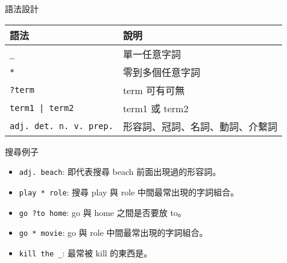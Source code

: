 \documentclass[12pt,c]{beamer}
\begin{document}
\begin{frame}[plain,shrink=5]{語法設計}
  \begin{tabu}{X[1.2]X[2]}
    \hline
    \rowfont{\bf} 語法 & 說明  \\
    \hline 
    \lstinline/_/ & 單一任意字詞 \\
    \lstinline/*/ & 零到多個任意字詞  \\
    \lstinline/?term/ & term 可有可無 \\
    \lstinline!term1 | term2! & term1 或 term2 \\
    \lstinline/adj. det. n. v. prep./ & 形容詞、冠詞、名詞、動詞、介繫詞 \\
    \hline
  \end{tabu}

  \begin{block}{搜尋例子}
    \begin{itemize}
    \item \lstinline/adj. beach/: 即代表搜尋 beach 前面出現過的形容詞。
    \item \lstinline/play * role/: 搜尋 play 與 role 中間最常出現的字詞組合。
    \item \lstinline/go ?to home/: go 與 home 之間是否要放 to。
    \item \lstinline/go * movie/: go 與 role 中間最常出現的字詞組合。 
    \item \lstinline/kill the _/: 最常被 kill 的東西是。
    \end{itemize}
  \end{block}
\end{frame}
\end{document}
